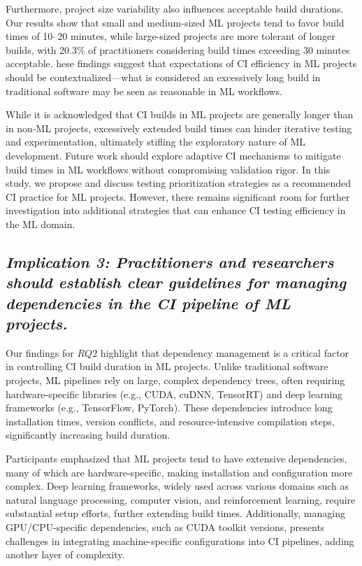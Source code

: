 Furthermore, project size variability also influences acceptable build durations. Our results show that small and medium-sized ML projects tend to favor build times of 10–20 minutes, while large-sized projects are more
tolerant of longer builds, with 20.3\% of practitioners considering build times exceeding 30 minutes acceptable.
hese findings suggest that expectations of CI efficiency in ML projects should be contextualized---what is considered an excessively long build in traditional software may be seen as reasonable in ML workflows.

While it is acknowledged that CI builds in ML projects are generally longer than in non-ML projects, excessively extended build times can hinder iterative testing and experimentation, ultimately stifling the exploratory nature of ML development.
Future work should explore adaptive CI mechanisms to mitigate build times in ML workflows without compromising validation rigor. In this study, we propose and discuss testing prioritization strategies as a recommended CI practice for ML projects. However, there remains significant room for further investigation into additional strategies that can enhance CI testing efficiency in the ML domain.

\subsection*{\textit{\textbf{Implication 3: Practitioners and researchers should establish clear guidelines for managing dependencies in the CI pipeline of ML projects.}}}

Our findings for $RQ2$ highlight that dependency management is a critical factor in controlling CI build duration in ML projects. Unlike traditional software projects, ML pipelines rely on large, complex dependency trees, often requiring hardware-specific libraries (e.g., CUDA, cuDNN, TensorRT) and deep learning frameworks (e.g., TensorFlow, PyTorch). These dependencies introduce long installation times, version conflicts, and resource-intensive compilation steps, significantly increasing build duration.

Participants emphasized that ML projects tend to have extensive dependencies, many of which are hardware-specific, making installation and configuration more complex. Deep learning frameworks, widely used across various domains such as natural language processing, computer vision, and reinforcement learning, require substantial setup efforts, further extending build times. Additionally, managing GPU/CPU-specific dependencies, such as CUDA toolkit versions, presents challenges in integrating machine-specific configurations into CI pipelines, adding another layer of complexity.

